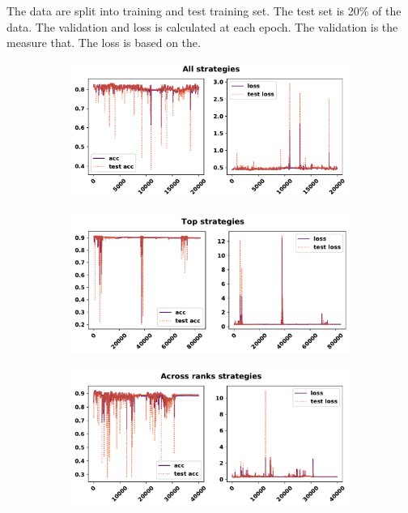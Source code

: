 The data are split into training and test training set. The test set is
20\% of the data. The validation and loss is calculated at each epoch.
The validation is the measure that. The loss is based on the.


\begin{figure}[!htbp]
    \begin{subfigure}{\textwidth}
    \centering
    \includegraphics[width=.8\textwidth]{src/chapters/07/img/validation_plot_all_strategies.pdf}
    \end{subfigure}\hfill
    \begin{subfigure}{\textwidth}
    \centering
    \includegraphics[width=.8\textwidth]{src/chapters/07/img/validation_plot_top_strategies.pdf}
    \end{subfigure}
    \begin{subfigure}{\textwidth}
    \centering
    \includegraphics[width=.8\textwidth]{src/chapters/07/img/validation_plot_across_ranks_strategies.pdf}
    \end{subfigure}

\end{figure}
